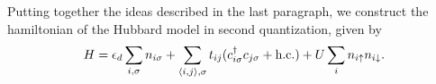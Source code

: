 \documentclass[12pt]{report}
\begin{document}
\n

Putting together the ideas described in the last paragraph, we construct the hamiltonian of the Hubbard model in second quantization, given by
\begin{equation} \label{eq:hubbard-hamiltonian}
H = \epsilon_d \sum_{i, \sigma} n_{i\sigma} +  \sum_{\left\langle i , j \right\rangle, \sigma} t_{ij} (c_{i\sigma}^\dagger c_{j\sigma} + \text{h.c.})
+ U \sum_{i} n_{i\uparrow} n_{i\downarrow}.
\end{equation}








%
%
%
%
%
\end{document}

